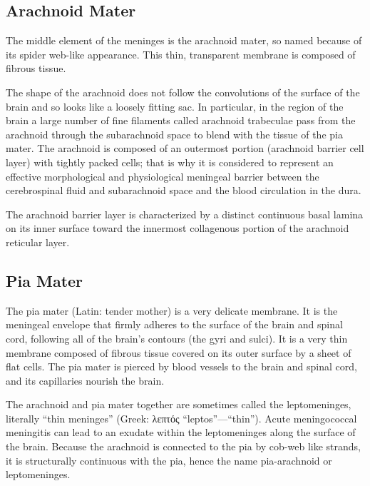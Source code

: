 \documentclass[]{book}
\begin{document}
\hypertarget{arachnoid-mater}{%
\subsection{Arachnoid Mater}\label{arachnoid-mater}}

The middle element of the meninges is the arachnoid mater, so named because of its spider web-like appearance. This thin, transparent membrane is composed of fibrous tissue.

The shape of the arachnoid does not follow the convolutions of the surface of the brain and so looks like a loosely fitting sac. In particular, in the region of the brain a large number of fine filaments called arachnoid trabeculae pass from the arachnoid through the subarachnoid space to blend with the tissue of the pia mater. The arachnoid is composed of an outermost portion (arachnoid barrier cell layer) with tightly packed cells; that is why it is considered to represent an effective morphological and physiological meningeal barrier between the cerebrospinal fluid and subarachnoid space and the blood circulation in the dura.

The arachnoid barrier layer is characterized by a distinct continuous basal lamina on its inner surface toward the innermost collagenous portion of the arachnoid reticular layer.

\hypertarget{pia-mater}{%
\subsection{Pia Mater}\label{pia-mater}}

The pia mater (Latin: tender mother) is a very delicate membrane. It is the meningeal envelope that firmly adheres to the surface of the brain and spinal cord, following all of the brain's contours (the gyri and sulci). It is a very thin membrane composed of fibrous tissue covered on its outer surface by a sheet of flat cells. The pia mater is pierced by blood vessels to the brain and spinal cord, and its capillaries nourish the brain.

The arachnoid and pia mater together are sometimes called the leptomeninges, literally ``thin meninges'' (Greek: λεπτός ``leptos''---``thin''). Acute meningococcal meningitis can lead to an exudate within the leptomeninges along the surface of the brain. Because the arachnoid is connected to the pia by cob-web like strands, it is structurally continuous with the pia, hence the name pia-arachnoid or leptomeninges.
\end{document}

